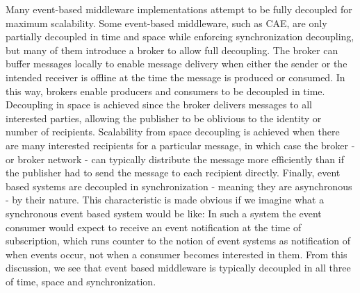 \documentclass{acm_proc_article-sp}
\begin{document}
Many event-based middleware implementations attempt to be fully decoupled for maximum scalability. Some event-based middleware, such as CAE, are only partially decoupled in time and space while enforcing synchronization decoupling, but many of them introduce a broker to allow full decoupling. The broker can buffer messages locally to enable message delivery when either the sender or the intended receiver is offline at the time the message is produced or consumed. In this way, brokers enable producers and consumers to be decoupled in time. Decoupling in space is achieved since the broker delivers messages to all interested parties, allowing the publisher to be oblivious to the identity or number of recipients. Scalability from space decoupling is achieved when there are many interested recipients for a particular message, in which case the broker - or broker network - can typically distribute the message more efficiently than if the publisher had to send the message to each recipient directly. Finally, event based systems are decoupled in synchronization - meaning they are asynchronous - by their nature. This characteristic is made obvious if we imagine what a synchronous event based system would be like: In such a system the event consumer would expect to receive an event notification at the time of subscription, which runs counter to the notion of event systems as notification of when events occur, not when a consumer becomes interested in them. From this discussion, we see that event based middleware is typically decoupled in all three of time, space and synchronization. 


\end{document}
